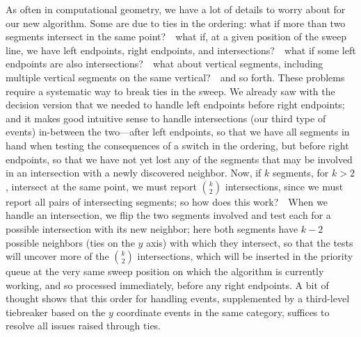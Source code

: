 \documentclass[11pt]{article}
\begin{document}
As often in computational geometry, we have a lot of details to worry
about for our new algorithm.  Some are due to ties in the ordering:
what if more than two segments intersect in the same point?\ \ what if,
at a given position of the sweep line, we have left endpoints, right
endpoints, and intersections?\ \ what if some left endpoints are also
intersections?\ \ what about vertical segments, including multiple
vertical segments on the same vertical?\ \ and so forth.  These problems 
require a systematic way to break ties in the sweep.  We already saw with
the decision version that we needed to handle left endpoints before right
endpoints; and it makes good intuitive sense to handle intersections
(our third type of events) in-between the two---after left endpoints, so
that we have all segments in hand when testing the consequences of
a switch in the ordering, but before right endpoints, so that we have
not yet lost any of the segments that may be involved in an intersection
with a newly discovered neighbor.  Now, if $k$ segments, for $k>2$, intersect
at the same point, we must report $k\choose 2$ intersections, since we
must report all pairs of intersecting segments; so how does this work?\ \ 
When we handle an intersection, we flip the two segments involved and
test each for a possible intersection with its new neighbor; here both
segments have $k-2$ possible neighbors (ties on the $y$ axis) with which
they intersect, so that the tests will uncover more of the $k \choose 2$
intersections, which will be inserted in the priority queue at the very
same sweep position on which the algorithm is currently working, and
so processed immediately, before any right endpoints.  A bit of thought
shows that this order for handling events, supplemented by a third-level
tiebreaker based on the $y$ coordinate events in the same category, 
suffices to resolve all issues raised through ties.
\end{document}
